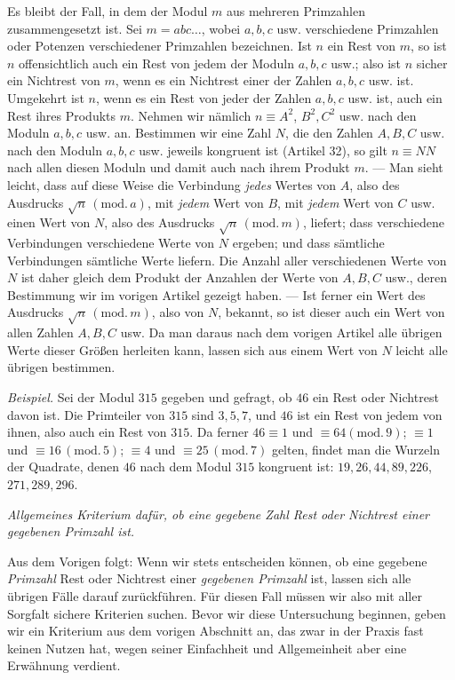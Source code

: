 Es bleibt der Fall, in dem der Modul $m$ aus mehreren Primzahlen zusammengesetzt ist. Sei $m=abc\ldots$, wobei $a,b,c$ usw. verschiedene Primzahlen oder Potenzen verschiedener Primzahlen bezeichnen. Ist $n$ ein Rest von $m$, so ist $n$ offensichtlich auch ein Rest von jedem der Moduln $a,b,c$ usw.; also ist $n$ sicher ein Nichtrest von $m$, wenn es ein Nichtrest einer der Zahlen $a,b,c$ usw. ist. Umgekehrt ist $n$, wenn es ein Rest von jeder der Zahlen $a,b,c$ usw. ist, auch ein Rest ihres Produkts $m$. Nehmen wir nämlich $n\equiv A^2$, $B^2,C^2$ usw. nach den Moduln $a,b,c$ usw. an. Bestimmen wir eine Zahl $N$, die den Zahlen $A,B,C$ usw. nach den Moduln $a,b,c$ usw. jeweils kongruent ist (Artikel 32), so gilt $n\equiv NN$ nach allen diesen Moduln und damit auch nach ihrem Produkt $m$. --- Man sieht leicht, dass auf diese Weise die Verbindung \emph{jedes} Wertes von $A$, also des Ausdrucks $\surd n\,(\mathrm{mod.}\,a)$, mit \emph{jedem} Wert von $B$, mit \emph{jedem} Wert von $C$ usw. einen Wert von $N$, also des Ausdrucks $\surd n\,(\mathrm{mod.}\,m)$, liefert; dass verschiedene Verbindungen verschiedene Werte von $N$ ergeben; und dass sämtliche Verbindungen sämtliche Werte liefern. Die Anzahl aller verschiedenen Werte von $N$ ist daher gleich dem Produkt der Anzahlen der Werte von $A,B,C$ usw., deren Bestimmung wir im vorigen Artikel gezeigt haben. --- Ist ferner ein Wert des Ausdrucks $\surd n\,(\mathrm{mod.}\,m)$, also von $N$, bekannt, so ist dieser auch ein Wert von allen Zahlen $A,B,C$ usw. Da man daraus nach dem vorigen Artikel alle übrigen Werte dieser Größen herleiten kann, lassen sich aus einem Wert von $N$ leicht alle übrigen bestimmen.

\emph{Beispiel.} Sei der Modul $315$ gegeben und gefragt, ob $46$ ein Rest oder Nichtrest davon ist. Die Primteiler von $315$ sind $3,5,7$, und $46$ ist ein Rest von jedem von ihnen, also auch ein Rest von $315$. Da ferner $46\equiv1$ und $\equiv64 (\mathrm{mod.}\,9)$; $\equiv1$ und $\equiv16\,(\mathrm{mod.}\,5)$; $\equiv4$ und $\equiv25\,(\mathrm{mod.}\,7)$ gelten, findet man die Wurzeln der Quadrate, denen $46$ nach dem Modul $315$ kongruent ist: $19,26,44,89,226$, $271,289,296$.

\begin{center}
\small\itshape
Allgemeines Kriterium dafür, ob eine gegebene Zahl Rest oder Nichtrest einer gegebenen Primzahl ist.
\end{center}

Aus dem Vorigen folgt: Wenn wir stets entscheiden können, ob eine gegebene \emph{Primzahl} Rest oder Nichtrest einer \emph{gegebenen Primzahl} ist, lassen sich alle übrigen Fälle darauf zurückführen. Für diesen Fall müssen wir also mit aller Sorgfalt sichere Kriterien suchen. Bevor wir diese Untersuchung beginnen, geben wir ein Kriterium aus dem vorigen Abschnitt an, das zwar in der Praxis fast keinen Nutzen hat, wegen seiner Einfachheit und Allgemeinheit aber eine Erwähnung verdient.

